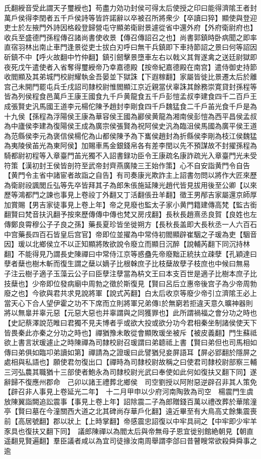 氏翻綬音受此謂天子璽綬也】苟盡力効功封侯可得太后使授之印曰能得濟隂王者封萬戶侯得李閏者五千戶侯詩等皆許諾辭以卒被召所將衆少【卒讀曰猝】顯使與登迎吏士於左掖門外詩因格殺登歸營屯守顯弟衛尉景遽從省中還外府【外府衛尉府也】收兵至盛德門孫程傳召諸尚書使收景【傳召傳詔召之也】尚書郭鎮時卧病聞之即率直宿羽林出南止車門逢景從吏士拔白刃呼曰無干兵鎮即下車持節詔之景曰何等詔因斫鎮不中【呼火故翻中竹仲翻】鎮引劒擊景墮車左右以戟义其胷遂禽之送廷尉獄即夜死戊午遣使者入省奪得璽綬帝乃幸嘉德殿【按帝紀嘉德殿在南宫】遣侍御史持節收閻顯及其弟城門校尉耀執金吾晏並下獄誅【下遐稼翻】家屬皆徙比景遷太后於離宫己未開門罷屯兵壬戌詔司隸校尉惟閻顯江京近親當伏辜誅其餘務崇寛貸封孫程等皆為列侯程食邑萬戶王康王國食九千戶黄龍食五千戶彭愷孟叔李建食四千二百戶王成張賢史汎馬國王道李元楊佗陳予趙封李剛食四千戶魏猛食二千戶苖光食千戶是為十九侯【孫程為浮陽侯王康為華容侯王國為酈侯黄龍為湘南侯彭愷為西平昌侯孟叔為中廬侯李建為復陽侯王成為廣宗侯張賢為祝阿侯史汎為臨沮侯馬國為廣平侯王道為范縣侯李元為褒信侯楊佗為山都侯陳予為下巂侯趙封為折縣侯李剛為枝江侯魏猛為夷陵侯苖光為東阿侯】加賜車馬金銀錢帛各有差李閏以先不預謀故不封擢孫程為騎都尉初程等入章臺門苖光獨不入詔書録功臣令王康疏名康詐疏光入章臺門光未受符策【漢初封王侯皆剖符至武帝封齊燕廣陵三王始作策】心不自安詣黄門令自告【黄門令主省中諸宦者故詣之自告】有司奏康光欺詐主上詔書勿問以將作大匠來歷為衛尉祋諷閭丘弘等先卒皆拜其子為郎朱倀施延陳光趙代皆見拔用後至公卿【以來歷等鴻都門之諫也事見上卷祋丁外翻又丁活翻倀丑羊翻】徵王男邴吉家屬還京師厚加賞賜【男吉家徒事見上卷上年】帝之見廢也監太子家小黄門籍建傳高梵【監古銜翻賢曰梵音扶汎翻予按來歷傳傳中傳也梵又房戌翻】長秋長趙熹丞良賀【良姓也左傳鄭良霄穆公子子良之孫】藥長夏珍皆坐徙朔方【長秋長盖即大長秋丞一人六百石中宫藥長四百石皆皇后宫官】帝即位並擢為中常侍初閻顯辟崔駰之子瑗為吏【駰音因】瑗以北鄉侯立不以正知顯將敗欲說令廢立而顯日沉醉【說輔芮翻下同沉持林翻】不能得見乃謂長史陳禪曰中常侍江京等惑蠱先帝廢黜正統扶立疎孽【孔穎達曰孽者蘖也樹木斬而復生謂之蘖以嫡子比根榦庶子比枝蘖故孽子枝庶也中候曰無易子注云樹子適子玉藻云公子曰臣孽注孽當為枿文王曰本支百世是適子比樹本庶子比技蘖也】少帝即位發病廟中周勃之徵於斯復見【賢曰呂后立惠帝後宫子為少帝周勃廢之也】今欲與君共求見說將軍【說式芮翻】白太后收京等廢少帝引立濟隂王必上當天心下合人望伊霍之功不下席而立則將軍兄弟傳於無窮若拒違天意久曠神器則將以無辠并辜元惡【元惡大惡也并辜謂與之同獲罪也】此所謂禍福之會分功之時也【史記蔡澤說范睢曰君獨不見夫博者乎或欲大投或欲分功今君相秦坐制諸侯使天下皆畏秦此亦秦之分功之時也】禪猶豫未敢從會顯敗瑗坐被斥【被皮義翻】門生蘇祗欲上書言狀瑗遽止之時陳禪為司隸校尉召瑗謂曰弟聼祗上書【賢曰弟但也司馬相如傳曰弟俱如臨卭弟讀如第】禪請為之證瑗曰此譬猶兒妾屏語耳【屏必郢翻於隱屏之處相與私語也】願使君勿復出口【禪時為司隸校尉故稱之曰使君司隸校尉部察三輔三河弘農其職猶十三部使者鮑永為司隸校尉光武曰奉使如此何如復扶又翻下同】遂辭歸不復應州郡命　己卯以諸王禮葬北鄉侯　司空劉授以阿附惡逆辟召非其人策免【辟召非人事見上卷延光二年】　十二月甲申以少府河南陶敦為司空　楊震門生虞放陳翼詣闕追訟震事【事見上卷上年】詔除震二子為郎贈錢百萬以禮改葬於華隂潼亭【賢曰墓在今潼關西大道之北其碑尚存華戶化翻】遠近畢至有大鳥高丈餘集震喪前【高居號翻】郡以狀上【上時掌翻】帝感震忠詔復以中牢具祠之【中牢即少牢羊豕具也復扶又翻下同】　議郎陳禪以為閻太后與帝無母子恩宜徙别館絶朝見【朝直遥翻見賢遍翻】羣臣議者咸以為宜司徒掾汝南周舉謂李郃曰昔瞽瞍常欲殺舜舜事之逾